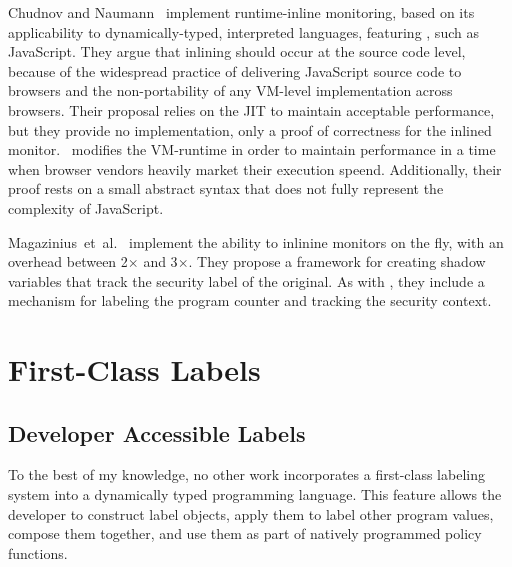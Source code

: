 Chudnov and Naumann~\cite{chudnov.naumann+10} implement runtime-inline monitoring, based on its applicability to dynamically-typed, interpreted languages, featuring , such as JavaScript.
They argue that inlining should occur at the source code level, because of the widespread practice of delivering JavaScript source code to browsers and the non-portability of any VM-level implementation across browsers.
Their proposal relies on the JIT to maintain acceptable performance, but they provide no implementation, only a proof of correctness for the inlined monitor.
\FlowCore\ modifies the VM-runtime in order to maintain performance in a time when browser vendors heavily market their execution speend.
Additionally, their proof rests on a small abstract syntax that does not fully represent the complexity of JavaScript.

Magazinius~et~al.~\cite{magazinius.etal+12} implement the ability to inlinine monitors on the fly, with an overhead between 2$\times$ and 3$\times$.
They propose a framework for creating shadow variables that track the security label of the original.
As with \FlowCore, they include a mechanism for labeling the program counter and tracking the security context.


\section{First-Class Labels}
\subsection{Developer Accessible Labels}

To the best of my knowledge, no other work incorporates a first-class labeling system into a dynamically typed programming language.
This feature allows the developer to construct label objects, apply them to label other program values, compose them together, and use them as part of natively programmed policy functions.


